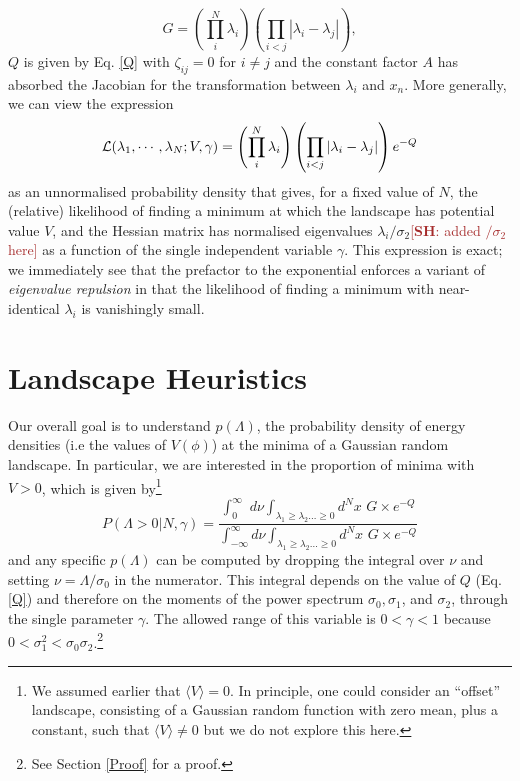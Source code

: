 \documentclass[12pt]{article}
\newcommand{\SH}[1]{\textcolor{brown}{[{\bf SH}: #1]}}
\begin{document}
\begin{equation}
G = \left(\prod_{i}^{N} \lambda_i \right)\left(\prod_{i<j} |\lambda_i-\lambda_j|\right),
\end{equation} 
%
$Q$ is given by Eq. \ref{Q} with $\zeta_{ij}=0$ for $i\neq j$ and the constant factor $A$ has absorbed the Jacobian for the transformation between $\lambda_i$ and $x_n$. More generally, we can view the expression
%
\begin{equation}
{\cal L}(\lambda_1,\cdots, \lambda_N; V, \gamma) = \left(\prod_{i}^{N} \lambda_i \right)\left(\prod_{i<j} |\lambda_i-\lambda_j|\right) e^{-Q}
\end{equation} 
%
as an unnormalised probability density that gives, for a fixed value of $N$, the (relative) likelihood of finding a minimum at which the landscape has potential value $V$, and the Hessian matrix has normalised eigenvalues $\lambda_i/\sigma_2$\SH{added  $/\sigma_2$ here} as a function of the single independent variable $\gamma$. This expression is exact;  we immediately see that the prefactor to the exponential enforces a variant of {\em eigenvalue repulsion\/} \cite{Mehta1990}  in that the likelihood of finding a minimum with near-identical $\lambda_i$ is vanishingly small. 



\section{Landscape Heuristics}

Our  overall goal is to understand $p(\Lambda)$, the probability density of energy densities (i.e the values of $V(\phi)$) at the minima of a Gaussian random landscape. In particular, we are interested in the proportion of  minima with $V > 0$, which is given by\footnote{We assumed earlier that $\langle V \rangle = 0$. In principle, one could consider an ``offset'' landscape, consisting of a Gaussian random function with zero mean, plus a constant, such that $\langle V \rangle \neq 0$ but we do not explore this here.}
\begin{equation} \label{PminIntegral}
  P(\Lambda >0| N,\gamma) =  \frac{\int^\infty_0 \,\,d\nu \int_{\lambda_1 \geq \lambda_2 \ldots \geq 0} d^Nx \,\, G \times e^{-Q} }{\int^\infty_{-\infty} d\nu \int_{\lambda_1 \geq \lambda_2 \ldots \geq 0} d^Nx\,\,G \times e^{-Q}}
  \end{equation}
 and any specific $p(\Lambda)$ can be computed by dropping the integral over $\nu$ and setting $\nu=\Lambda/\sigma_0$ in the numerator.  
%
This integral depends on the value of $Q$ (Eq. \ref{Q}) and therefore on the moments of the power spectrum $\sigma_0, \sigma_1$,  and $\sigma_2$, through the single parameter $\gamma$. The allowed range of this variable is $0<\gamma<1$ because $0<\sigma_1^2<\sigma_0\sigma_2$.\footnote{See Section \ref{Proof} for a proof.}
\end{document}
